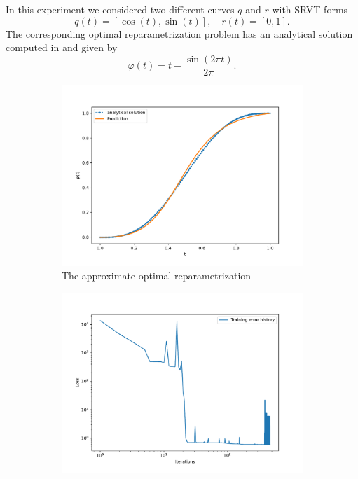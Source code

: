 In this experiment we considered two different curves \(q\) and \(r\) with SRVT forms
\begin{equation*}
    q(t) = [\cos(t), \sin(t)], \quad  r(t) = [0,1]. 
\end{equation*}
The corresponding optimal reparametrization problem has an analytical solution computed in \cite[A.1]{woien2019} and given by 
\begin{equation*}
    \varphi(t) = t - \frac{\sin(2 \pi t)}{2 \pi}.
\end{equation*}

\begin{figure}[b]
    \begin{subfigure}[b]{0.5\textwidth}
        \centering
        \includegraphics[width=\linewidth]{figures/curve_2/exp_3/plot_0_0.pdf}
        \caption{The approximate optimal reparametrization}\label{fig:curve_2_solution}
    \end{subfigure}
    \begin{subfigure}[t]{0.5\textwidth}
        \centering
        \includegraphics[width=\linewidth]{figures/curve_2/exp_3/history_plot_0.pdf}

\end{subfigure}
\end{figure}
